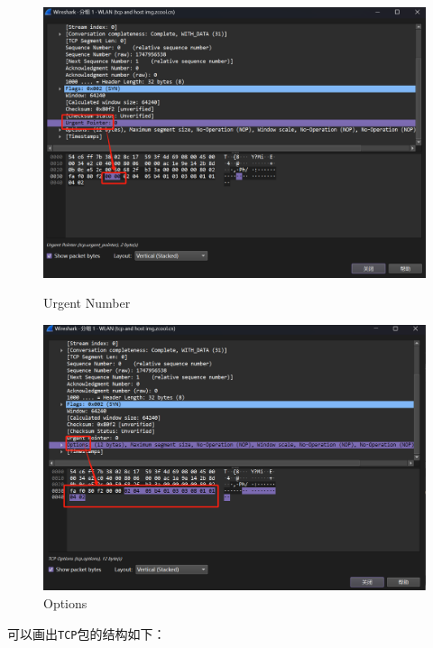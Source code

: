 \documentclass{article}
\begin{document}
	\begin{figure}[H]
		\centering
		\begin{minipage}[b]{0.45\textwidth}
			\includegraphics[width=\textwidth]{images/13.Urgent Number.png}
			\caption{Urgent Number}
		\end{minipage}
		\hfill
		\begin{minipage}[b]{0.45\textwidth}
			\includegraphics[width=\textwidth]{images/14.Options.png}
			\caption{Options}
		\end{minipage}
	\end{figure}
	
	可以画出\texttt{TCP}包的结构如下：
	
\end{document}
